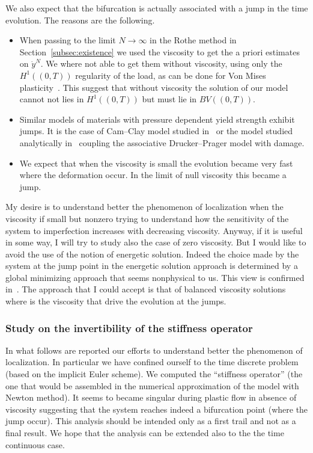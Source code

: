 We also expect that the bifurcation is actually associated with a jump in the time evolution. The reasons are the following.
\begin{itemize}
\item[(i)] When passing to the limit $N\to\infty$ in the Rothe method in Section~\ref{subsec:existence} we used the viscosity to get the a priori estimates on $\dot y^N$. We where not able to get them without viscosity, using only the $H^1((0,T))$ regularity of the load, as can be done for Von Mises plasticity~\cite{han-reddy}. This suggest that without viscosity the solution of our model cannot not lies in $H^1((0,T))$ but must lie in $BV((0,T))$.
\item[(ii)] Similar models of materials with pressure dependent yield strength exhibit jumps. It is the case of Cam--Clay model studied in~\cite{daldessol09} or the model studied analytically in~\cite{energetic-geomaterials} coupling the associative Drucker--Prager model with damage.
\item[(iii)] We expect that when the viscosity is small the evolution became very fast where the deformation occur. In the limit of null viscosity this became a jump.
\end{itemize}
\begin{rmk}
My desire is to understand better the phenomenon of localization when the viscosity if small but nonzero trying to understand how the sensitivity of the system to imperfection increases with decreasing viscosity. Anyway, if it is useful in some way, I will try to study also the case of zero viscosity. But I would like to avoid the use of the notion of energetic solution. Indeed the choice made by the system at the jump point in the energetic solution approach is determined by a global minimizing approach that seems nonphysical to us. This view is confirmed in~\cite{mierosBV}. The approach that I could accept is that of balanced viscosity solutions where is the viscosity that drive the evolution at the jumps.
\end{rmk}

\subsubsection*{Study on the invertibility of the stiffness operator}

In what follows are reported our efforts to understand better the phenomenon of localization. In particular we have confined ourself to the time discrete problem (based on the implicit Euler scheme). We computed the ``stiffness operator'' (the one that would be assembled in the numerical approximation of the model with Newton method). It seems to became singular during plastic flow in absence of viscosity suggesting that the system reaches indeed a bifurcation point (where the jump occur). This analysis should be intended only as a first trail and not as a final result. We hope that the analysis can be extended also to the the time continuous case.

